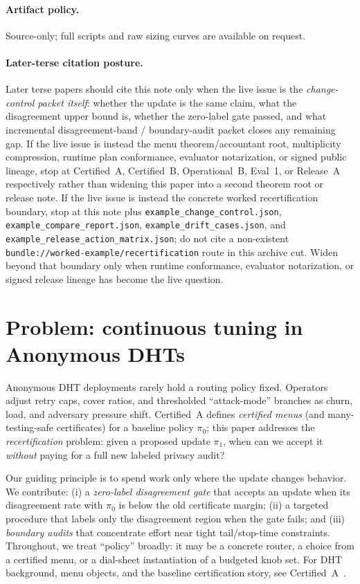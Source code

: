 \documentclass[11pt]{article}
\begin{document}
\paragraph{Artifact policy.}
Source-only; full scripts and raw sizing curves are available on request.\cite{series:artifactpolicy}

\paragraph{Later-terse citation posture.}
Later terse papers should cite this note only when the live issue is the \emph{change-control packet itself}: whether the update is the same claim, what the disagreement upper bound is, whether the zero-label gate passed, and what incremental disagreement-band / boundary-audit packet closes any remaining gap.
If the live issue is instead the menu theorem/accountant root, multiplicity compression, runtime plan conformance, evaluator notarization, or signed public lineage, stop at Certified~A, Certified~B, Operational~B, Eval~1, or Release~A respectively rather than widening this paper into a second theorem root or release note.
If the live issue is instead the concrete worked recertification boundary, stop at this note plus 
\nolinkurl{example\_change\_control.json}, 
\nolinkurl{example\_compare\_report.json}, 
\nolinkurl{example\_drift\_cases.json}, and 
\nolinkurl{example\_release\_action\_matrix.json}; do not cite a non-existent 
\nolinkurl{bundle://worked-example/recertification} route in this archive cut. Widen beyond that boundary only when runtime conformance, evaluator notarization, or signed release lineage has become the live question.\cite{series:menus,series:sigcomp,series:workedexample,series:operationalB,series:eval1,series:releaseA}

\section{Problem: continuous tuning in Anonymous DHTs}
Anonymous DHT deployments rarely hold a routing policy fixed.
Operators adjust retry caps, cover ratios, and thresholded ``attack-mode'' branches as churn, load, and adversary pressure shift.
Certified~A defines \emph{certified menus} (and many-testing-safe certificates) for a baseline policy $\pi_0$; this paper addresses the \emph{recertification} problem:
given a proposed update $\pi_1$, when can we accept it \emph{without} paying for a full new labeled privacy audit?

Our guiding principle is to spend work only where the update changes behavior.
We contribute:
(i) a \emph{zero-label disagreement gate} that accepts an update when its disagreement rate with $\pi_0$ is below the old certificate margin;
(ii) a targeted procedure that labels only the disagreement region when the gate fails; and
(iii) \emph{boundary audits} that concentrate effort near tight tail/stop-time constraints.
Throughout, we treat ``policy'' broadly: it may be a concrete router, a choice from a certified menu, or a dial-sheet instantiation of a budgeted knob set.
For DHT background, menu objects, and the baseline certification story, see Certified~A~\cite{series:menus}.
\end{document}
